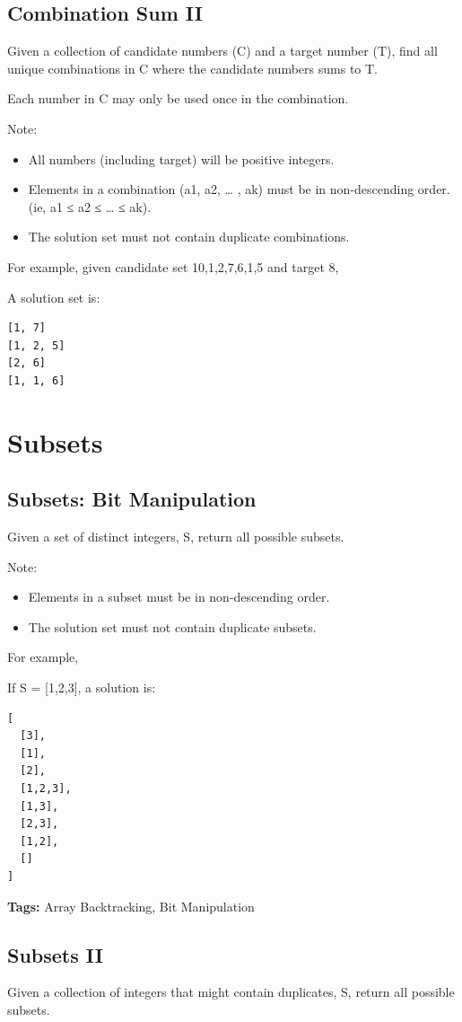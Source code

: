 \documentclass[11pt]{book}
\begin{document}
\subsection{Combination Sum II}
\label{sec-16-2-3}
Given a collection of candidate numbers (C) and a target number (T), find all unique combinations in C where the candidate numbers sums to T.

Each number in C may only be used once in the combination.

Note:
\begin{itemize}
\item All numbers (including target) will be positive integers.
\item Elements in a combination (a1, a2, … , ak) must be in non-descending order. (ie, a1 ≤ a2 ≤ … ≤ ak).
\item The solution set must not contain duplicate combinations.
\end{itemize}
For example, given candidate set 10,1,2,7,6,1,5 and target 8, 

A solution set is: 
\lstset{language=java,label= ,caption= ,numbers=none}
\begin{lstlisting}
[1, 7] 
[1, 2, 5] 
[2, 6] 
[1, 1, 6]
\end{lstlisting}
\section{Subsets}
\label{sec-16-3}
\subsection{Subsets: Bit Manipulation}
\label{sec-16-3-1}
Given a set of distinct integers, S, return all possible subsets.

Note:
\begin{itemize}
\item Elements in a subset must be in non-descending order.
\item The solution set must not contain duplicate subsets.
\end{itemize}
For example,

If S = [1,2,3], a solution is:
\lstset{language=java,label= ,caption= ,numbers=none}
\begin{lstlisting}
[
  [3],
  [1],
  [2],
  [1,2,3],
  [1,3],
  [2,3],
  [1,2],
  []
]
\end{lstlisting}
\textbf{Tags:} Array Backtracking, Bit Manipulation
\subsection{Subsets II}
\label{sec-16-3-2}
Given a collection of integers that might contain duplicates, S, return all possible subsets.
\end{document}

